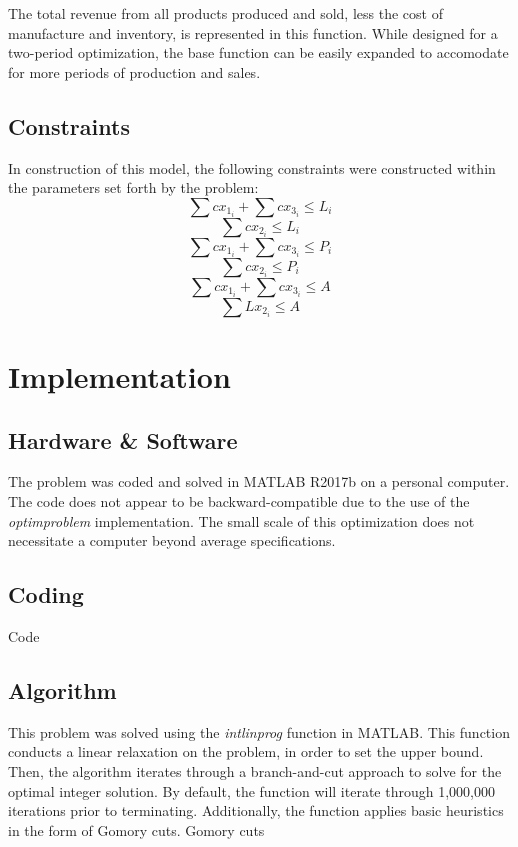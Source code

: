 \documentclass{article}
\begin{document}
The total revenue from all products produced and sold, less the cost of manufacture and inventory, is represented in this function.  While designed for a two-period optimization, the base function can be easily expanded to accomodate for more periods of production and sales.

\subsection{Constraints}
In construction of this model, the following constraints were constructed within the parameters set forth by the problem:
\begin{equation}
\sum cx_{1_i} + \sum cx_{3_i} \leq L_{i}
\end{equation}
\begin{equation}
\sum cx_{2_i} \leq L_{i}
\end{equation}
\begin{equation}
\sum cx_{1_i} + \sum cx_{3_i} \leq P_{i}
\end{equation}
\begin{equation}
\sum cx_{2_i} \leq P_{i}
\end{equation}
\begin{equation}
\sum cx_{1_i} + \sum cx_{3_i} \leq A
\end{equation}
\begin{equation}
\sum Lx_{2_i} \leq A
\end{equation}

\section{Implementation}
\subsection{Hardware \& Software}
The problem was coded and solved in MATLAB R2017b on a personal computer.  The code does not appear to be backward-compatible due to the use of the \textit{optimproblem} implementation.  The small scale of this optimization does not necessitate a computer beyond average specifications.
\subsection{Coding}
Code
\subsection{Algorithm}
This problem was solved using the \textit{intlinprog} function in MATLAB.  This function conducts a linear relaxation on the problem, in order to set the upper bound.  Then, the algorithm iterates through a branch-and-cut approach to solve for the optimal integer solution.  By default, the function 
will iterate through 1,000,000 iterations prior to terminating.  Additionally, the function applies basic heuristics in the form of Gomory cuts.  Gomory cuts 
\end{document}
